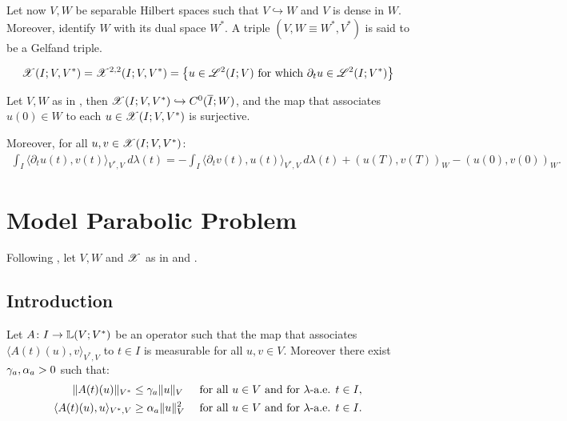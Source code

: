 \begin{definition} \label{definition:gelfand}
    Let now $V, W$ be separable Hilbert spaces such that $V \hookrightarrow W$ and $V$ is dense in $W$. Moreover, identify $W$ with its dual space $W^*$. A triple $\left( V, W \equiv W^*, V^* \right)$ is said to be a Gelfand triple.
\end{definition}

\begin{definition}[$\SpaceX(I; V, V^*)$] \label{definition:x}
    \begin{align}
        \mathscr{X}(I; V, V^*) = \mathscr{X}^{2, 2}(I; V, V^*) = \left\{ u \in \mathscr{L}^{2}(I; V) \text{ for which } \partial_t u \in \mathscr{L}^{2}(I; V^*) \right\}
    \end{align}
\end{definition}

\begin{theorem}
    Let $V, W$ as in , then \newline \nobreak $\mathscr{X}(I; V, V^*) \hookrightarrow C^0(\overline{I};W)$, and the map that associates $u(0) \in W$ to each $u \in \mathscr{X}(I; V, V^*)$ is surjective.

    Moreover, for all $u, v \in \mathscr{X}(I; V, V^*)$:
    \begin{align}
        \int_I \langle \partial_t u(t), v(t) \rangle_{V^*, V} ~ d \lambda(t) = - \int_I \langle \partial_t v(t), u(t) \rangle_{V^*, V} ~ d \lambda(t) + \left( u(T), v(T) \right)_W - \left( u(0), v(0) \right)_W.
    \end{align}
\end{theorem}

\newpage
\section{Model Parabolic Problem} \label{sec:model_problem}

Following \cite[p.~124]{Ern2021}, let $V, W$ and $\mathscr{X}$ as in  and .

\subsection{Introduction} \label{subsection:introduction}

\begin{definition}[$A$] \label{definition:A} %
    Let $A \colon I \rightarrow \mathbb{L}(V;V^*)$ be an operator such that the map that associates $\langle A(t)(u), v \rangle_{V^*, V}$ to $t \in I$ is measurable for all $u, v \in V$. Moreover there exist $\gamma_{a}, \alpha_{a} > 0$ such that:
    \begin{align} \label{equation:a}
        \lVert A(t)(u) \rVert_{V^*} & \leq \gamma_{a} \lVert u \rVert_V &\text{ for all } u \in V \text{ and for } \lambda \text{-a.e. } t \in I, \\
        \langle A(t)(u), u \rangle_{V^*, V} & \geq \alpha_{a} \lVert u \rVert_V^2 &\text{ for all } u \in V \text{ and for } \lambda \text{-a.e. } t \in I.
    \end{align}
\end{definition}

